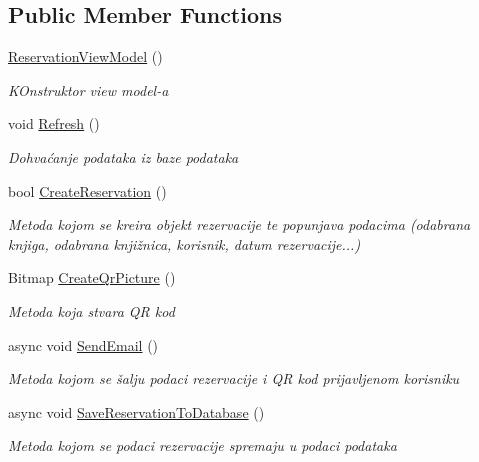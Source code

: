 \subsection*{Public Member Functions}
\begin{DoxyCompactItemize}
\item 
\mbox{\hyperlink{class_easy_library_application_1_1_w_p_f_1_1_view_model_1_1_reservation_view_model_a2f650e87ceb0f6bf17a5e7b384a9cc29}{Reservation\+View\+Model}} ()
\begin{DoxyCompactList}\small\item\em K\+Onstruktor view model-\/a \end{DoxyCompactList}\item 
void \mbox{\hyperlink{class_easy_library_application_1_1_w_p_f_1_1_view_model_1_1_reservation_view_model_a6e364c75ed2e8c4841fd3b821748ebf6}{Refresh}} ()
\begin{DoxyCompactList}\small\item\em Dohvaćanje podataka iz baze podataka \end{DoxyCompactList}\item 
bool \mbox{\hyperlink{class_easy_library_application_1_1_w_p_f_1_1_view_model_1_1_reservation_view_model_a15f4bffbd97c33ba6593ff3b8f22f972}{Create\+Reservation}} ()
\begin{DoxyCompactList}\small\item\em Metoda kojom se kreira objekt rezervacije te popunjava podacima (odabrana knjiga, odabrana knjižnica, korisnik, datum rezervacije...) \end{DoxyCompactList}\item 
Bitmap \mbox{\hyperlink{class_easy_library_application_1_1_w_p_f_1_1_view_model_1_1_reservation_view_model_aa6d3dd879f96a485185c160ed39cbfef}{Create\+Qr\+Picture}} ()
\begin{DoxyCompactList}\small\item\em Metoda koja stvara QR kod \end{DoxyCompactList}\item 
async void \mbox{\hyperlink{class_easy_library_application_1_1_w_p_f_1_1_view_model_1_1_reservation_view_model_adc2f62d5b2744a23ccce98fed73e9a3e}{Send\+Email}} ()
\begin{DoxyCompactList}\small\item\em Metoda kojom se šalju podaci rezervacije i QR kod prijavljenom korisniku \end{DoxyCompactList}\item 
async void \mbox{\hyperlink{class_easy_library_application_1_1_w_p_f_1_1_view_model_1_1_reservation_view_model_addfe2a1a29cee69fa8fae2f60bf88c82}{Save\+Reservation\+To\+Database}} ()
\begin{DoxyCompactList}\small\item\em Metoda kojom se podaci rezervacije spremaju u podaci podataka \end{DoxyCompactList}\end{DoxyCompactItemize}
